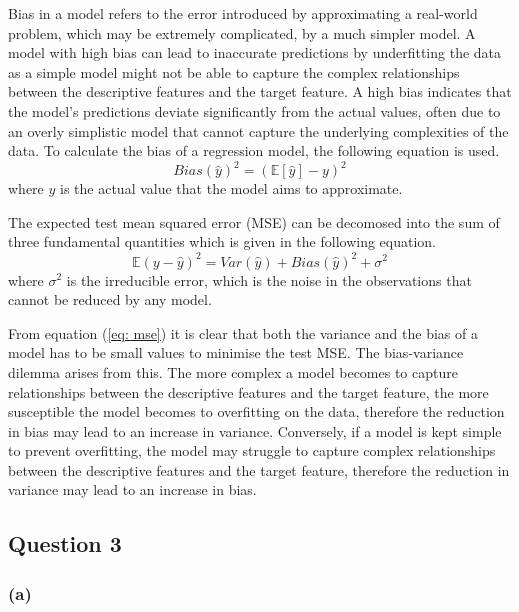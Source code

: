 \documentclass[10pt]{article}
\begin{document}
Bias in a model refers to the error introduced by approximating a real-world problem, which may be extremely
complicated, by a much simpler model. A model with high bias can lead to inaccurate predictions by underfitting the data as a simple
model might not be able to capture the complex relationships between the descriptive features and the target feature.
A high bias indicates that the model's predictions deviate significantly from the actual values, often due to an overly
simplistic model that cannot capture the underlying complexities of the data. To calculate the bias of a regression model, the
following equation is used.
\begin{equation}
    Bias(\hat{y})^2 = \left( \mathbb{E}[\hat{y}] - y \right)^2
\end{equation}
where $y$ is the actual value that the model aims to approximate.

The expected test mean squared error (MSE) can be decomosed into the sum of three fundamental
quantities which is given in the following equation.
\begin{equation}
    \mathbb{E}\left(y - \hat{y}\right)^2 = Var(\hat{y}) + Bias(\hat{y})^2 + \sigma^2 \label{eq: mse}
\end{equation}
where $\sigma^2$ is the irreducible error, which is the noise in the observations
that cannot be reduced by any model.

From equation (\ref{eq: mse}) it is clear that both the variance and the
bias of a model has to be small values to minimise the test MSE. The
bias-variance dilemma arises from this. The more complex
a model becomes to capture relationships between the descriptive features and the target feature, the more susceptible
the model becomes to overfitting on the data, therefore the reduction in bias may
lead to an increase in variance. Conversely, if a model is kept simple to prevent overfitting, the
model may struggle to capture complex relationships between the descriptive features and the target feature, therefore the
reduction in variance may lead to an increase in bias.

\subsection*{Question 3}

\subsubsection*{(a)}
\end{document}
